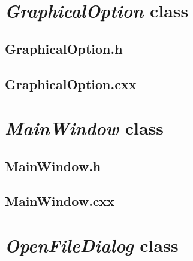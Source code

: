 
\newpage


\section{\textit{GraphicalOption} class}

\subsection{GraphicalOption.h}


\newpage

\subsection{GraphicalOption.cxx}


\newpage


\section{\textit{MainWindow} class}

\subsection{MainWindow.h}


\newpage

\subsection{MainWindow.cxx}


\newpage


\section{\textit{OpenFileDialog} class}

